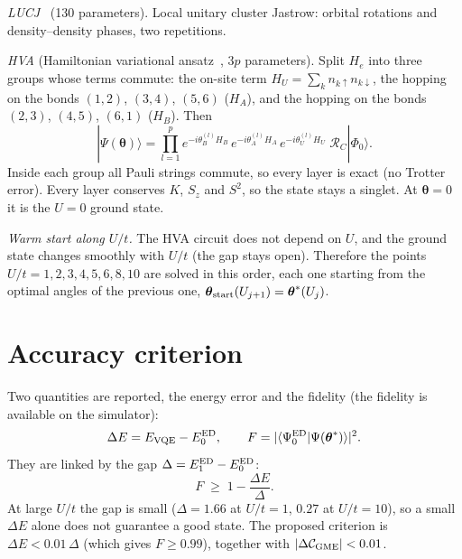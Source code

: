 \documentclass[11pt,a4paper]{article}
\newcommand{\up}{\uparrow}
\newcommand{\dn}{\downarrow}
\begin{document}
\emph{LUCJ}~\cite{motta} (130 parameters). Local unitary cluster Jastrow: orbital rotations
and density--density phases, two repetitions.

\emph{HVA} (Hamiltonian variational ansatz~\cite{wecker,cade}, $3p$
parameters). Split $H_e$ into three groups whose terms commute: the on-site
term $H_U = \sum_k n_{k\up}n_{k\dn}$, the hopping on the bonds $(1,2)$, $(3,4)$,
$(5,6)$ ($H_A$), and the hopping on the bonds $(2,3)$, $(4,5)$, $(6,1)$ ($H_B$).
Then
\begin{equation}
  |\Psi(\boldsymbol\theta)\rangle = \prod_{l=1}^{p}
  e^{-i\theta^{(l)}_B H_B}\, e^{-i\theta^{(l)}_A H_A}\, e^{-i\theta^{(l)}_U H_U}\;
  \mathcal{R}_C|\Phi_0\rangle .
\end{equation}
Inside each group all Pauli strings commute, so every layer is exact (no
Trotter error). Every layer conserves $K$, $S_z$ and $S^2$, so the state stays a
singlet. At $\boldsymbol\theta = 0$ it is the $U = 0$ ground state.

\emph{Warm start along $U/t$.} The HVA circuit does not depend on $U$, and the
ground state changes smoothly with $U/t$ (the gap stays open). Therefore the
points $U/t = 1, 2, 3, 4, 5, 6, 8, 10$ are solved in this order, each one
starting from the optimal angles of the previous one, $\boldsymbol\theta_{\rm start}(U_{j+1}) = \boldsymbol\theta^*(U_j)$.

\section{Accuracy criterion}

Two quantities are reported, the energy error and the fidelity (the fidelity
is available on the simulator):
\begin{equation}
  \Delta E = E_{\rm VQE} - E_0^{\rm ED} , \qquad
  F = |\langle\Psi_0^{\rm ED}|\Psi(\boldsymbol\theta^*)\rangle|^2 .
\end{equation}
They are linked by the gap $\Delta = E_1^{\rm ED} - E_0^{\rm ED}$:
\begin{equation}
  F \;\ge\; 1 - \frac{\Delta E}{\Delta} .
\end{equation}
At large $U/t$ the gap is small ($\Delta = 1.66$ at $U/t = 1$, $0.27$ at
$U/t = 10$), so a small $\Delta E$ alone does not guarantee a good state. The proposed
criterion is $\Delta E < 0.01\,\Delta$ (which gives $F \ge 0.99$),
together with $|\Delta \mathcal{C}_{\rm GME}| < 0.01$.
\end{document}
